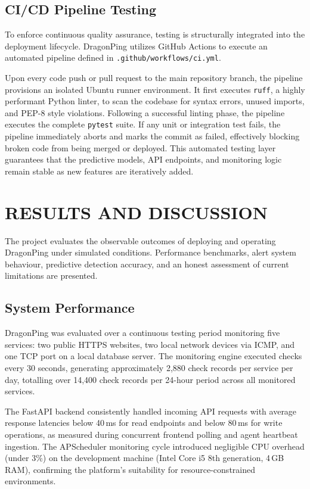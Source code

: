 \documentclass[12pt,a4paper,oneside]{report}
\begin{document}
\section{CI/CD Pipeline Testing}
\noindent To enforce continuous quality assurance, testing is structurally integrated into the deployment lifecycle. DragonPing utilizes GitHub Actions to execute an automated pipeline defined in \texttt{.github/workflows/ci.yml}. 

\noindent Upon every code push or pull request to the main repository branch, the pipeline provisions an isolated Ubuntu runner environment. It first executes \texttt{ruff}, a highly performant Python linter, to scan the codebase for syntax errors, unused imports, and PEP-8 style violations. Following a successful linting phase, the pipeline executes the complete \texttt{pytest} suite. If any unit or integration test fails, the pipeline immediately aborts and marks the commit as failed, effectively blocking broken code from being merged or deployed. This automated testing layer guarantees that the predictive models, API endpoints, and monitoring logic remain stable as new features are iteratively added.

\chapter{RESULTS AND DISCUSSION}

The project evaluates the observable outcomes of deploying and operating DragonPing under simulated conditions. Performance benchmarks, alert system behaviour, predictive detection accuracy, and an honest assessment of current limitations are presented.

\section{System Performance}
\noindent DragonPing was evaluated over a continuous testing period monitoring five services: two public HTTPS websites, two local network devices via ICMP, and one TCP port on a local database server. The monitoring engine executed checks every 30 seconds, generating approximately 2,880 check records per service per day, totalling over 14,400 check records per 24-hour period across all monitored services.

\noindent The FastAPI backend consistently handled incoming API requests with average response latencies below 40\,ms for read endpoints and below 80\,ms for write operations, as measured during concurrent frontend polling and agent heartbeat ingestion. The APScheduler monitoring cycle introduced negligible CPU overhead (under 3\%) on the development machine (Intel Core i5 8th generation, 4\,GB RAM), confirming the platform's suitability for resource-constrained environments.
\end{document}
